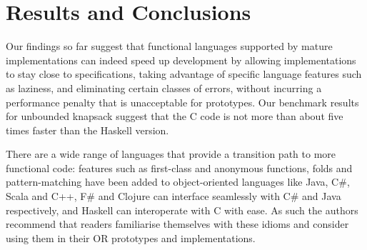 \section{Results and Conclusions}

Our findings so far suggest that functional languages supported by mature
implementations can indeed speed up development by allowing implementations to
stay close to specifications, taking advantage of specific language features
such as laziness, and eliminating certain classes of errors, without incurring
a performance penalty that is unacceptable for prototypes. Our
benchmark results for unbounded knapsack suggest that the C
code is not more than about five times faster than the Haskell version.

There are a wide range of languages that provide a transition path to more functional code: features such as first-class and anonymous functions, folds and pattern-matching have been added to object-oriented languages like Java, C\#, Scala and C++, F\# and Clojure can interface seamlessly with C\# and Java respectively, and Haskell can interoperate with C with ease. As such the authors recommend that readers familiarise themselves with these idioms and consider using them in their OR prototypes and implementations.
